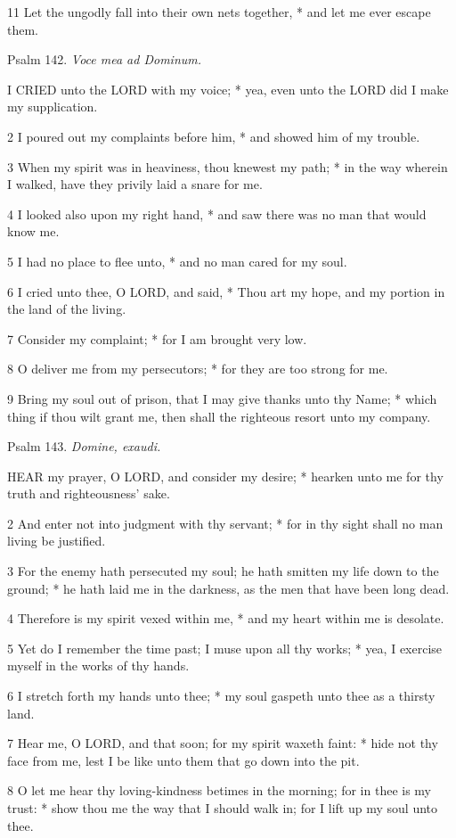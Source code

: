 11 Let the ungodly fall into their own nets together,
* and let me ever escape them.

Psalm
142. \emph{Voce mea ad Dominum.}

I
CRIED unto the LORD with my voice; * yea, even unto the LORD did I make
my supplication.

2 I poured out my complaints before him, * and showed
him of my trouble.

3 When my spirit was in heaviness, thou knewest my
path; * in the way wherein I walked, have they privily laid a snare for
me.

4 I looked also upon my right hand, * and saw there
was no man that would know me.

5 I had no place to flee unto, * and no man cared for
my soul.

6 I cried unto thee, O LORD,
and said, * Thou art my hope, and my portion in the land of the living.

7 Consider my complaint; * for I am brought very low.

8 O deliver me from my persecutors; * for they are
too strong for me.

9 Bring my soul out of prison, that I may give thanks
unto thy Name; * which thing if thou wilt grant me, then shall the righteous
resort unto my company.

Psalm
143. \emph{Domine, exaudi.}

HEAR
my prayer, O LORD, and consider my desire; * hearken unto me for thy truth
and righteousness' sake.

2 And enter not into judgment with thy servant; * for
in thy sight shall no man living be justified.

3 For the enemy hath persecuted my soul; he hath smitten
my life down to the ground; * he hath laid me in the darkness, as the
men that have been long dead.

4 Therefore is my spirit vexed within me, * and my
heart within me is desolate.

5 Yet do I remember the time past; I muse upon all
thy works; * yea, I exercise myself in the works of thy hands.

6 I stretch forth my hands unto thee; * my soul gaspeth
unto thee as a thirsty land.

7 Hear me, O LORD, and that soon; for my spirit waxeth
faint: * hide not thy face from me, lest I be like unto them that go down
into the pit.

8 O let me hear thy loving-kindness betimes in the
morning; for in thee is my trust: * show thou me the way that I should
walk in; for I lift up my soul unto thee.

